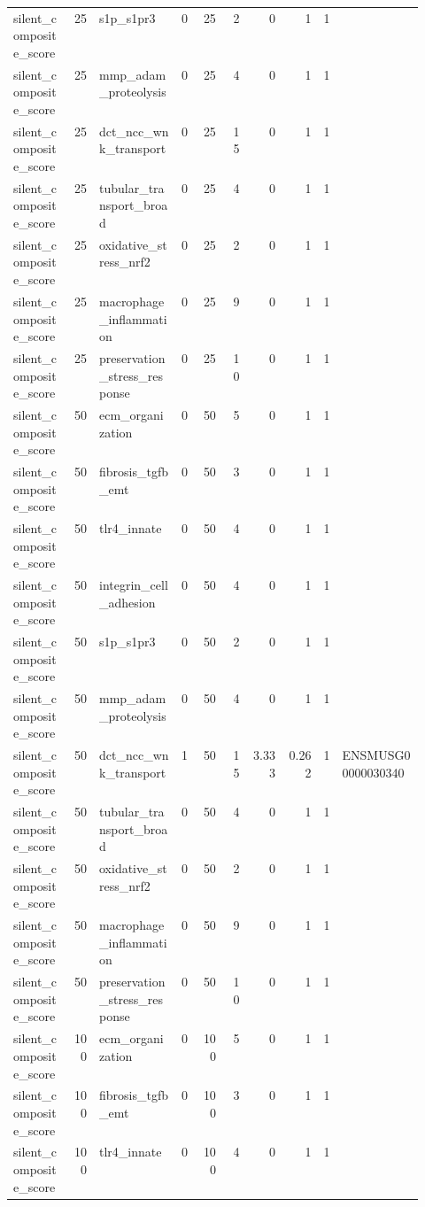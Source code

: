 \documentclass[11pt]{article}
\begin{document}
\begin{landscape}
\begin{longtable}{p{0.14\linewidth}rp{0.20\linewidth}rrrrrrp{0.20\linewidth}}
silent\_composite\_score & 25 & s1p\_s1pr3 & 0 & 25 & 2 & 0 & 1 & 1 &  \\
silent\_composite\_score & 25 & mmp\_adam\_proteolysis & 0 & 25 & 4 & 0 & 1 & 1 &  \\
silent\_composite\_score & 25 & dct\_ncc\_wnk\_transport & 0 & 25 & 15 & 0 & 1 & 1 &  \\
silent\_composite\_score & 25 & tubular\_transport\_broad & 0 & 25 & 4 & 0 & 1 & 1 &  \\
silent\_composite\_score & 25 & oxidative\_stress\_nrf2 & 0 & 25 & 2 & 0 & 1 & 1 &  \\
silent\_composite\_score & 25 & macrophage\_inflammation & 0 & 25 & 9 & 0 & 1 & 1 &  \\
silent\_composite\_score & 25 & preservation\_stress\_response & 0 & 25 & 10 & 0 & 1 & 1 &  \\
silent\_composite\_score & 50 & ecm\_organization & 0 & 50 & 5 & 0 & 1 & 1 &  \\
silent\_composite\_score & 50 & fibrosis\_tgfb\_emt & 0 & 50 & 3 & 0 & 1 & 1 &  \\
silent\_composite\_score & 50 & tlr4\_innate & 0 & 50 & 4 & 0 & 1 & 1 &  \\
silent\_composite\_score & 50 & integrin\_cell\_adhesion & 0 & 50 & 4 & 0 & 1 & 1 &  \\
silent\_composite\_score & 50 & s1p\_s1pr3 & 0 & 50 & 2 & 0 & 1 & 1 &  \\
silent\_composite\_score & 50 & mmp\_adam\_proteolysis & 0 & 50 & 4 & 0 & 1 & 1 &  \\
silent\_composite\_score & 50 & dct\_ncc\_wnk\_transport & 1 & 50 & 15 & 3.333 & 0.262 & 1 & ENSMUSG00000030340 \\
silent\_composite\_score & 50 & tubular\_transport\_broad & 0 & 50 & 4 & 0 & 1 & 1 &  \\
silent\_composite\_score & 50 & oxidative\_stress\_nrf2 & 0 & 50 & 2 & 0 & 1 & 1 &  \\
silent\_composite\_score & 50 & macrophage\_inflammation & 0 & 50 & 9 & 0 & 1 & 1 &  \\
silent\_composite\_score & 50 & preservation\_stress\_response & 0 & 50 & 10 & 0 & 1 & 1 &  \\
silent\_composite\_score & 100 & ecm\_organization & 0 & 100 & 5 & 0 & 1 & 1 &  \\
silent\_composite\_score & 100 & fibrosis\_tgfb\_emt & 0 & 100 & 3 & 0 & 1 & 1 &  \\
silent\_composite\_score & 100 & tlr4\_innate & 0 & 100 & 4 & 0 & 1 & 1 &  \\

\end{longtable}
\end{landscape}
\end{document}
